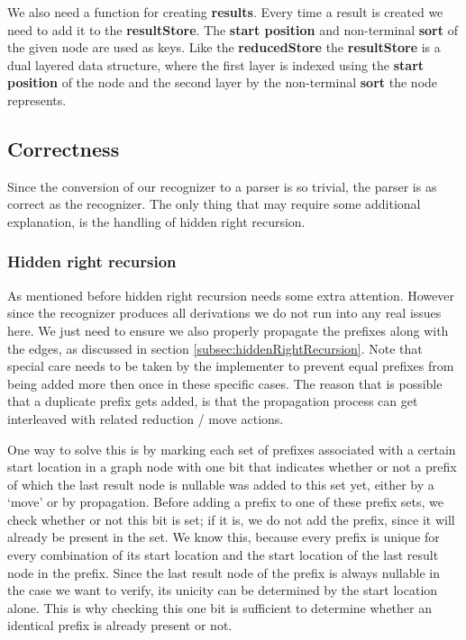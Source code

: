 \documentclass[a4paper,10pt]{article}
\begin{document}
We also need a function for creating {\bf results}. Every time a result is created we need to add it to the {\bf resultStore}. The {\bf start position} and non-terminal {\bf sort} of the given node are used as keys. Like the {\bf reducedStore} the {\bf resultStore} is a dual layered data structure, where the first layer is indexed using the {\bf start position} of the node and the second layer by the non-terminal {\bf sort} the node represents.

\subsection{Correctness}
\label{sec:parserCorrectness}

Since the conversion of our recognizer to a parser is so trivial, the parser is as correct as the recognizer. The only thing that may require some additional explanation, is the handling of hidden right recursion.

\subsubsection{Hidden right recursion}
As mentioned before hidden right recursion needs some extra attention. However since the recognizer produces all derivations we do not run into any real issues here. We just need to ensure we also properly propagate the prefixes along with the edges, as discussed in section \ref{subsec:hiddenRightRecursion}. Note that special care needs to be taken by the implementer to prevent equal prefixes from being added more then once in these specific cases. The reason that is possible that a duplicate prefix gets added, is that the propagation process can get interleaved with related reduction / move actions.

One way to solve this is by marking each set of prefixes associated with a certain start location in a graph node with one bit that indicates whether or not a prefix of which the last result node is nullable was added to this set yet, either by a `move' or by propagation. Before adding a prefix to one of these prefix sets, we check whether or not this bit is set; if it is, we do not add the prefix, since it will already be present in the set. We know this, because every prefix is unique for every combination of its start location and the start location of the last result node in the prefix. Since the last result node of the prefix is always nullable in the case we want to verify, its unicity can be determined by the start location alone. This is why checking this one bit is sufficient to determine whether an identical prefix is already present or not.
\end{document}
